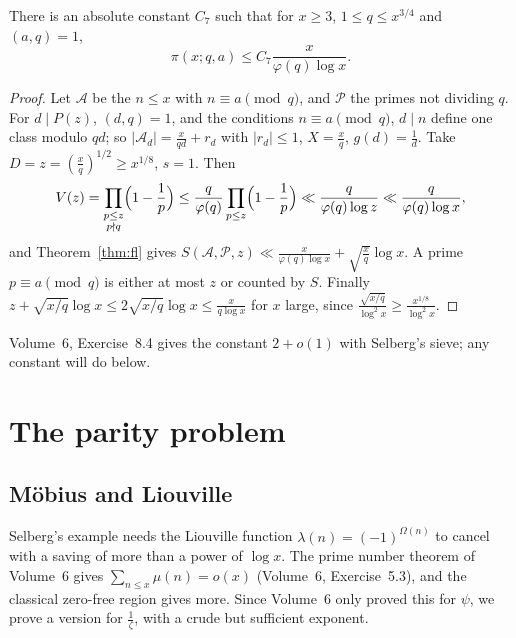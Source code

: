 \begin{corollary}\label{cor:btap}
There is an absolute constant $C_7$ such that for $x\ge3$, $1\le q\le x^{3/4}$ and $(a,q)=1$,
\[
\pi(x;q,a)\le C_7\frac x{\varphi(q)\log x}.
\]
\end{corollary}
\begin{proof}
Let $\mathcal A$ be the $n\le x$ with $n\equiv a\pmod q$, and $\mathcal P$ the primes not dividing $q$. For $d\mid P(z)$, $(d,q)=1$, and the conditions $n\equiv a\pmod q$, $d\mid n$ define one class modulo $qd$; so $|\mathcal A_d|=\frac x{qd}+r_d$ with $|r_d|\le1$, $X=\frac xq$, $g(d)=\frac1d$. Take $D=z=(\frac xq)^{1/2}\ge x^{1/8}$, $s=1$. Then
\[
V(z)=\prod_{\substack{p\le z\\p\nmid q}}\Bigl(1-\frac1p\Bigr)\le\frac q{\varphi(q)}\prod_{p\le z}\Bigl(1-\frac1p\Bigr)\ll\frac q{\varphi(q)\log z}\ll\frac q{\varphi(q)\log x},
\]
and Theorem~\ref{thm:fl} gives $S(\mathcal A,\mathcal P,z)\ll\frac x{\varphi(q)\log x}+\sqrt{\tfrac xq}\log x$. A prime $p\equiv a\pmod q$ is either at most $z$ or counted by $S$. Finally $z+\sqrt{x/q}\log x\le2\sqrt{x/q}\log x\le\frac x{q\log x}$ for $x$ large, since $\frac{\sqrt{x/q}}{\log^2x}\ge\frac{x^{1/8}}{\log^2x}$.
\end{proof}

Volume~6, Exercise~8.4 gives the constant $2+o(1)$ with Selberg's sieve; any constant will do below.

\section{The parity problem}

\subsection*{Möbius and Liouville}

Selberg's example needs the Liouville function $\lambda(n)=(-1)^{\Omega(n)}$ to cancel with a saving of more than a power of $\log x$. The prime number theorem of Volume~6 gives $\sum_{n\le x}\mu(n)=o(x)$ (Volume~6, Exercise~5.3), and the classical zero-free region gives more. Since Volume~6 only proved this for $\psi$, we prove a version for $\frac1\zeta$, with a crude but sufficient exponent.

